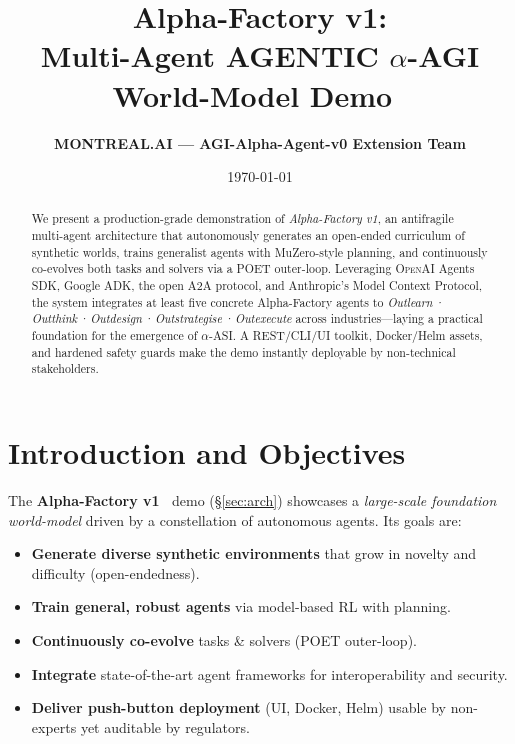 \documentclass[11pt]{article}
\title{\bfseries Alpha-Factory v1:\\ Multi-Agent AGENTIC \boldmath$\alpha$-AGI World-Model Demo
  \texorpdfstring{\emoji{👁️}\,\emoji{✨}}{}}
\author{\textbf{MONTREAL.AI — AGI-Alpha-Agent-v0 Extension Team}}
\date{\today}
\begin{document}
\maketitle
\vspace*{-0.5em}

\begin{abstract}
We present a production-grade demonstration of \emph{Alpha-Factory v1}, an
antifragile multi-agent architecture that autonomously generates an open-ended
curriculum of synthetic worlds, trains generalist agents with MuZero-style
planning, and continuously co-evolves both tasks and solvers via a POET
outer-loop.  Leveraging \textsc{OpenAI} Agents SDK, Google ADK, the open
\textsc{A2A} protocol, and Anthropic’s Model Context Protocol, the system
integrates at least five concrete Alpha-Factory agents to
\emph{Outlearn\,·\,Outthink\,·\,Outdesign\,·\,Outstrategise\,·\,Outexecute}
across industries—laying a practical foundation for the emergence of
\(\alpha\)-ASI.  A REST/CLI/UI toolkit, Docker/Helm assets, and hardened safety
guards make the demo instantly deployable by non-technical stakeholders.
\end{abstract}

\tableofcontents
\newpage

\section{Introduction and Objectives}\label{sec:intro}

The \textbf{Alpha-Factory v1 \,} demo
(\S\ref{sec:arch}) showcases a \emph{large-scale foundation world-model}
driven by a constellation of autonomous agents.  Its goals are:
\begin{itemize}[leftmargin=2em]
  \item \textbf{Generate diverse synthetic environments} that grow in novelty
        and difficulty (open-endedness).
  \item \textbf{Train general, robust agents} via model-based RL with planning.
  \item \textbf{Continuously co-evolve} tasks \& solvers (POET outer-loop).
  \item \textbf{Integrate} state-of-the-art agent frameworks for
        interoperability and security.
  \item \textbf{Deliver push-button deployment} (UI, Docker, Helm) usable by
        non-experts yet auditable by regulators.
\end{itemize}
\end{document}
